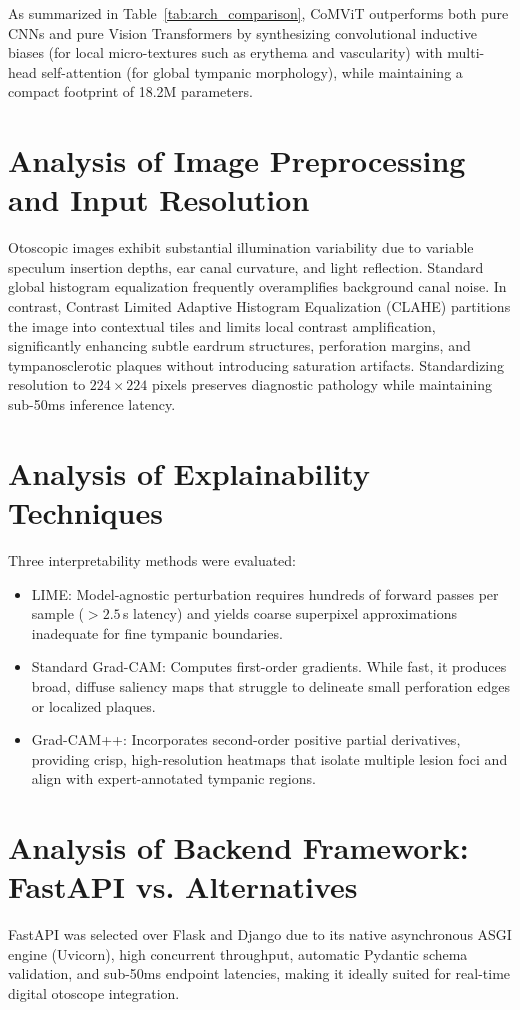 \documentclass[12pt,a4paper]{report}
\renewcommand{\textbf}[1]{#1}
\begin{document}
As summarized in Table~\ref{tab:arch_comparison}, CoMViT outperforms both pure CNNs and pure Vision Transformers by synthesizing convolutional inductive biases (for local micro-textures such as erythema and vascularity) with multi-head self-attention (for global tympanic morphology), while maintaining a compact footprint of 18.2M parameters.

\section{Analysis of Image Preprocessing and Input Resolution}
Otoscopic images exhibit substantial illumination variability due to variable speculum insertion depths, ear canal curvature, and light reflection. Standard global histogram equalization frequently overamplifies background canal noise. In contrast, Contrast Limited Adaptive Histogram Equalization (CLAHE) partitions the image into contextual tiles and limits local contrast amplification, significantly enhancing subtle eardrum structures, perforation margins, and tympanosclerotic plaques without introducing saturation artifacts. Standardizing resolution to $224 \times 224$ pixels preserves diagnostic pathology while maintaining sub-50ms inference latency.

\section{Analysis of Explainability Techniques}
Three interpretability methods were evaluated:
\begin{itemize}
    \item \textbf{LIME:} Model-agnostic perturbation requires hundreds of forward passes per sample ($>2.5$\,s latency) and yields coarse superpixel approximations inadequate for fine tympanic boundaries.
    \item \textbf{Standard Grad-CAM:} Computes first-order gradients. While fast, it produces broad, diffuse saliency maps that struggle to delineate small perforation edges or localized plaques.
    \item \textbf{Grad-CAM++:} Incorporates second-order positive partial derivatives, providing crisp, high-resolution heatmaps that isolate multiple lesion foci and align with expert-annotated tympanic regions.
\end{itemize}

\section{Analysis of Backend Framework: FastAPI vs. Alternatives}
FastAPI was selected over Flask and Django due to its native asynchronous ASGI engine (Uvicorn), high concurrent throughput, automatic Pydantic schema validation, and sub-50ms endpoint latencies, making it ideally suited for real-time digital otoscope integration.
\end{document}

